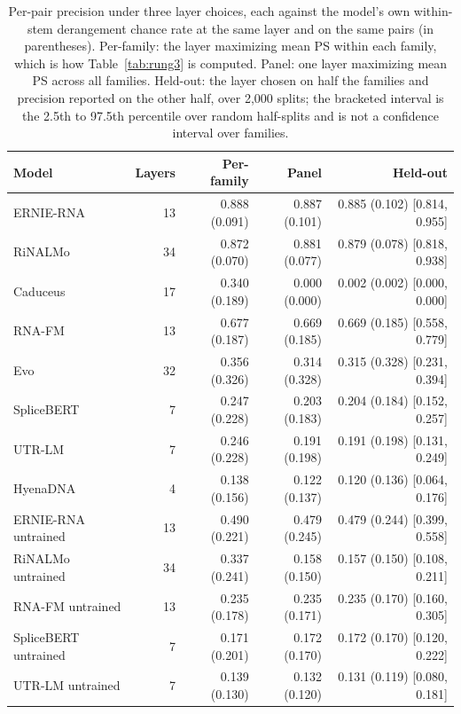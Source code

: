\begin{table}[htbp]
\centering
\caption{Per-pair precision under three layer choices, each against the model's own within-stem derangement chance rate at the same layer and on the same pairs (in parentheses). Per-family: the layer maximizing mean PS within each family, which is how Table~\ref{tab:rung3} is computed. Panel: one layer maximizing mean PS across all families. Held-out: the layer chosen on half the families and precision reported on the other half, over 2,000 splits; the bracketed interval is the 2.5th to 97.5th percentile over random half-splits and is not a confidence interval over families.}
\label{tab:layer-selection}
\small
\begin{tabular}{@{}lrrrr@{}}
\toprule
\textbf{Model} & \textbf{Layers} & \textbf{Per-family} & \textbf{Panel} & \textbf{Held-out} \\
\midrule
ERNIE-RNA & 13 & 0.888 (0.091) & 0.887 (0.101) & 0.885 (0.102) [0.814, 0.955] \\
RiNALMo & 34 & 0.872 (0.070) & 0.881 (0.077) & 0.879 (0.078) [0.818, 0.938] \\
Caduceus & 17 & 0.340 (0.189) & 0.000 (0.000) & 0.002 (0.002) [0.000, 0.000] \\
RNA-FM & 13 & 0.677 (0.187) & 0.669 (0.185) & 0.669 (0.185) [0.558, 0.779] \\
Evo & 32 & 0.356 (0.326) & 0.314 (0.328) & 0.315 (0.328) [0.231, 0.394] \\
SpliceBERT & 7 & 0.247 (0.228) & 0.203 (0.183) & 0.204 (0.184) [0.152, 0.257] \\
UTR-LM & 7 & 0.246 (0.228) & 0.191 (0.198) & 0.191 (0.198) [0.131, 0.249] \\
HyenaDNA & 4 & 0.138 (0.156) & 0.122 (0.137) & 0.120 (0.136) [0.064, 0.176] \\
ERNIE-RNA untrained & 13 & 0.490 (0.221) & 0.479 (0.245) & 0.479 (0.244) [0.399, 0.558] \\
RiNALMo untrained & 34 & 0.337 (0.241) & 0.158 (0.150) & 0.157 (0.150) [0.108, 0.211] \\
RNA-FM untrained & 13 & 0.235 (0.178) & 0.235 (0.171) & 0.235 (0.170) [0.160, 0.305] \\
SpliceBERT untrained & 7 & 0.171 (0.201) & 0.172 (0.170) & 0.172 (0.170) [0.120, 0.222] \\
UTR-LM untrained & 7 & 0.139 (0.130) & 0.132 (0.120) & 0.131 (0.119) [0.080, 0.181] \\
\bottomrule
\end{tabular}
\end{table}
